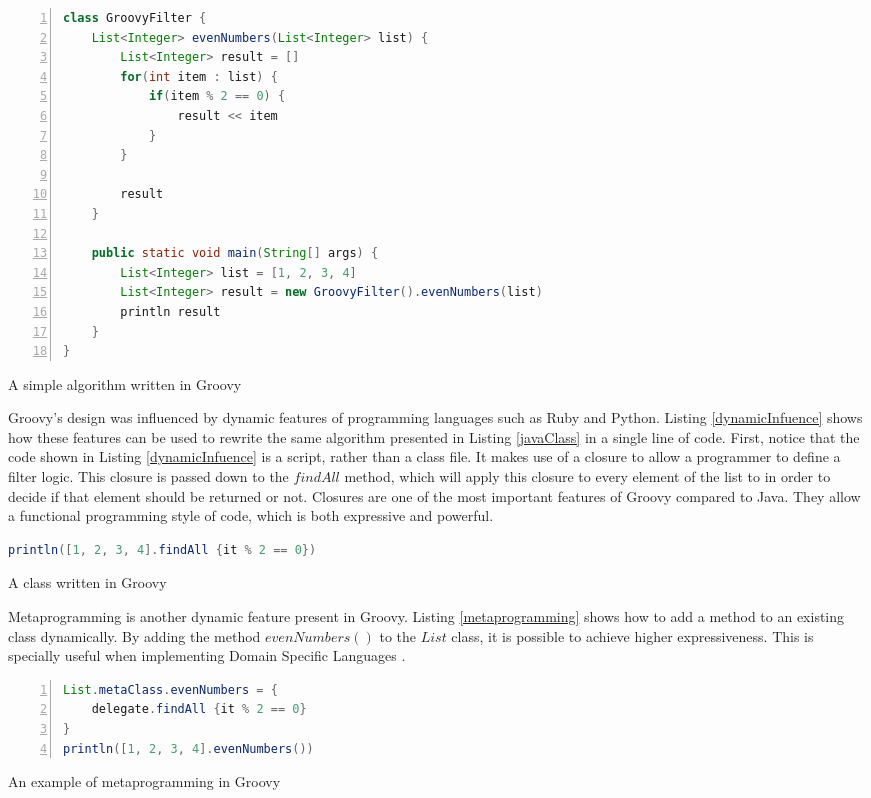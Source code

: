 \documentclass[preprint]{sigplanconf}
\begin{document}
\begin{Listing}[ht]
\begin{lstlisting}[language=Java,tabsize=2,breaklines=true,numbers=left]
class GroovyFilter {
	List<Integer> evenNumbers(List<Integer> list) {
		List<Integer> result = []
		for(int item : list) {
			if(item % 2 == 0) {
				result << item
			}
		}

		result
	}

	public static void main(String[] args) {
		List<Integer> list = [1, 2, 3, 4]
		List<Integer> result = new GroovyFilter().evenNumbers(list)
		println result
	}
}
\end{lstlisting}
\caption{A simple algorithm written in Groovy}
\label{groovyClass}
\end{Listing}

Groovy's design was influenced by dynamic features of programming languages such as Ruby and Python.
Listing \ref{dynamicInfuence} shows how these features can be used to rewrite the same algorithm presented in Listing \ref{javaClass} in a single line of code. 
First, notice that the code shown in Listing \ref{dynamicInfuence}  is a script, rather than a class file.
It makes use of a closure to allow a programmer to define a filter logic.
This closure is passed down to the $findAll$ method, which will apply this closure to every element of the list to in order to decide if that element should be returned or not.
Closures are one of the most important features of Groovy compared to Java.
They allow a functional programming style of code, which is both expressive and powerful.

\begin{Listing}[ht]
\begin{lstlisting}[language=Java,tabsize=2,breaklines=true]
println([1, 2, 3, 4].findAll {it % 2 == 0})
\end{lstlisting}
\caption{A class written in Groovy}
\label{dynamicInfuence}
\end{Listing}

Metaprogramming is another dynamic feature present in Groovy. 
Listing \ref{metaprogramming} shows how to add a method to an existing class dynamically.
By adding the method $evenNumbers()$ to the $List$ class, it is possible to achieve higher expressiveness.
This is specially useful when implementing Domain Specific Languages \cite{fowler10}.

\begin{Listing}[ht]
\begin{lstlisting}[language=Java,tabsize=2,breaklines=true,numbers=left]
List.metaClass.evenNumbers = {
	delegate.findAll {it % 2 == 0}
}
println([1, 2, 3, 4].evenNumbers())

\end{lstlisting}
\caption{An example of metaprogramming in Groovy}
\label{metaprogramming}
\end{Listing}
\end{document}
